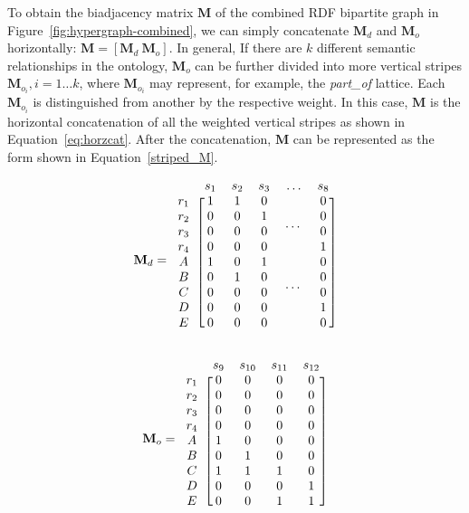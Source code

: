To obtain the biadjacency matrix $\mathbf{M}$ of the combined RDF bipartite graph in Figure~\ref{fig:hypergraph-combined}, we can simply concatenate $\mathbf{M}_d$ and $\mathbf{M}_o$ horizontally: $\mathbf{M}=\left[\mathbf{M}_d~\mathbf{M}_o\right]$. In general, If there are $k$ different semantic relationships in the ontology, $\mathbf{M}_o$ can be further divided into more vertical stripes $\mathbf{M}_{o_i}, i=1\dots k$, where $\mathbf{M}_{o_i}$ may represent, for example, the \emph{part\_of} lattice. Each $\mathbf{M}_{o_i}$ is  distinguished from another by the respective weight. In this case, $\mathbf{M}$ is the horizontal concatenation of all the weighted vertical stripes as shown in Equation~\ref{eq:horzcat}. After the concatenation, $\mathbf{M}$ can be represented as the form shown in Equation~\ref{striped_M}.


\begin{equation}\label{eq:Md}
\mathbf{M}_d=\begin{blockarray}{cccccc}
                  ~     &  s_1  &  s_2  &  s_3  & \dots &  s_8  \cr
            \begin{block}{c[ccccc]}
                 r_1    &   1   &   1   &   0   &\multirow{4}{*}{\dots} &   0   \cr
                 r_2    &   0   &   0   &   1   &       &   0   \cr
                 r_3    &   0   &   0   &   0   &       &   0   \cr
                 r_4    &   0   &   0   &   0   &       &   1   \cr
                  A     &   1   &   0   &   1   &\multirow{4}{*}{\dots} &   0   \cr
                  B     &   0   &   1   &   0   &       &   0   \cr
                  C     &   0   &   0   &   0   &       &   0   \cr
                  D     &   0   &   0   &   0   &       &   1   \cr
                  E     &   0   &   0   &   0   &       &   0   \cr
            \end{block}
        \end{blockarray}
\end{equation}

\begin{equation}\label{eq:Mo}
\mathbf{M}_o=\begin{blockarray}{ccccc}
                  ~     &  s_9  & s_{10}& s_{11}& s_{12}\cr
            \begin{block}{c[cccc]}
                 r_1    &   0   &   0   &   0   &   0   \cr
                 r_2    &   0   &   0   &   0   &   0   \cr
                 r_3    &   0   &   0   &   0   &   0   \cr
                 r_4    &   0   &   0   &   0   &   0   \cr
                  A     &   1   &   0   &   0   &   0   \cr
                  B     &   0   &   1   &   0   &   0   \cr
                  C     &   1   &   1   &   1   &   0   \cr
                  D     &   0   &   0   &   0   &   1   \cr
                  E     &   0   &   0   &   1   &   1   \cr
            \end{block}
        \end{blockarray}
\end{equation}

